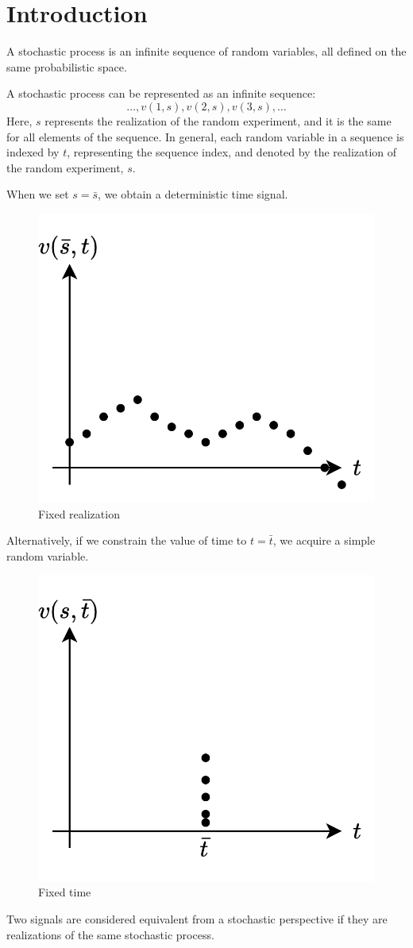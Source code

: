 \section{Introduction} 

\begin{definition}
    A stochastic process is an infinite sequence of random variables, all defined on the same probabilistic space.
\end{definition}
A stochastic process can be represented as an infinite sequence:
\[\dots,v(1,s),v(2,s),v(3,s),\dots\]
Here, $s$ represents the realization of the random experiment, and it is the same for all elements of the sequence.
In general, each random variable in a sequence is indexed by $t$, representing the sequence index, and denoted by the realization of the random experiment, $s$.

When we set $s=\bar{s}$, we obtain a deterministic time signal. 
\begin{figure}[H]
    \centering
    \includegraphics[width=0.35\linewidth]{images/outcome.png}
    \caption{Fixed realization}
\end{figure}
Alternatively, if we constrain the value of time to $t=\bar{t}$, we acquire a simple random variable. 
\begin{figure}[H]
    \centering
    \includegraphics[width=0.35\linewidth]{images/time.png}
    \caption{Fixed time}
\end{figure}

\begin{definition}
    Two signals are considered equivalent from a stochastic perspective if they are realizations of the same stochastic process.
\end{definition}

